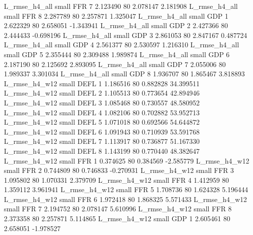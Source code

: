  L_rmse_h4_all      small      FFR                 7 2.123490 80       2.078147           2.181908
 L_rmse_h4_all      small      FFR                 8 2.287789 80       2.257871           1.325047
 L_rmse_h4_all      small      GDP                 1 2.622329 80       2.658051          -1.343941
 L_rmse_h4_all      small      GDP                 2 2.427366 80       2.444433          -0.698196
 L_rmse_h4_all      small      GDP                 3 2.861053 80       2.847167           0.487724
 L_rmse_h4_all      small      GDP                 4 2.561377 80       2.530597           1.216310
 L_rmse_h4_all      small      GDP                 5 2.355444 80       2.309488           1.989874
 L_rmse_h4_all      small      GDP                 6 2.187190 80       2.125692           2.893095
 L_rmse_h4_all      small      GDP                 7 2.055006 80       1.989337           3.301034
 L_rmse_h4_all      small      GDP                 8 1.936707 80       1.865467           3.818893
 L_rmse_h4_w12      small     DEFL                 1 1.186516 80       0.882828          34.399511
 L_rmse_h4_w12      small     DEFL                 2 1.105513 80       0.773654          42.894946
 L_rmse_h4_w12      small     DEFL                 3 1.085468 80       0.730557          48.580952
 L_rmse_h4_w12      small     DEFL                 4 1.082106 80       0.702882          53.952713
 L_rmse_h4_w12      small     DEFL                 5 1.071018 80       0.692566          54.644872
 L_rmse_h4_w12      small     DEFL                 6 1.091943 80       0.710939          53.591768
 L_rmse_h4_w12      small     DEFL                 7 1.113917 80       0.736877          51.167330
 L_rmse_h4_w12      small     DEFL                 8 1.143199 80       0.770440          48.382647
 L_rmse_h4_w12      small      FFR                 1 0.374625 80       0.384569          -2.585779
 L_rmse_h4_w12      small      FFR                 2 0.744809 80       0.746833          -0.270931
 L_rmse_h4_w12      small      FFR                 3 1.095802 80       1.070331           2.379709
 L_rmse_h4_w12      small      FFR                 4 1.412959 80       1.359112           3.961941
 L_rmse_h4_w12      small      FFR                 5 1.708736 80       1.624328           5.196444
 L_rmse_h4_w12      small      FFR                 6 1.972418 80       1.868325           5.571433
 L_rmse_h4_w12      small      FFR                 7 2.194752 80       2.078147           5.610996
 L_rmse_h4_w12      small      FFR                 8 2.373358 80       2.257871           5.114865
 L_rmse_h4_w12      small      GDP                 1 2.605461 80       2.658051          -1.978527
